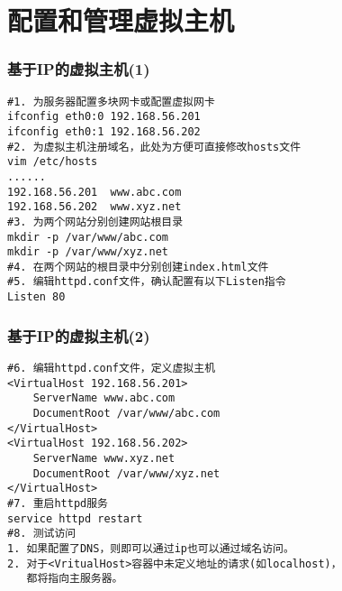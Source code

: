 \documentclass[xcolor=svgnames,presentation]{beamer}
\begin{document}
\section{配置和管理虚拟主机}
\label{sec-3}
\begin{frame}[fragile]
\frametitle{基于IP的虚拟主机(1)}
\label{sec-3-1}


\begin{verbatim}
#1. 为服务器配置多块网卡或配置虚拟网卡
ifconfig eth0:0 192.168.56.201
ifconfig eth0:1 192.168.56.202
#2. 为虚拟主机注册域名，此处为方便可直接修改hosts文件
vim /etc/hosts
......
192.168.56.201  www.abc.com
192.168.56.202  www.xyz.net
#3. 为两个网站分别创建网站根目录
mkdir -p /var/www/abc.com
mkdir -p /var/www/xyz.net
#4. 在两个网站的根目录中分别创建index.html文件
#5. 编辑httpd.conf文件，确认配置有以下Listen指令
Listen 80
\end{verbatim}
\end{frame}
\begin{frame}[fragile]
\frametitle{基于IP的虚拟主机(2)}
\label{sec-3-2}


\begin{verbatim}
#6. 编辑httpd.conf文件，定义虚拟主机
<VirtualHost 192.168.56.201>
    ServerName www.abc.com
    DocumentRoot /var/www/abc.com
</VirtualHost>
<VirtualHost 192.168.56.202>
    ServerName www.xyz.net
    DocumentRoot /var/www/xyz.net
</VirtualHost>
#7. 重启httpd服务
service httpd restart
#8. 测试访问
1. 如果配置了DNS，则即可以通过ip也可以通过域名访问。
2. 对于<VritualHost>容器中未定义地址的请求(如localhost)，
   都将指向主服务器。
\end{verbatim}
\end{frame}
\end{document}
